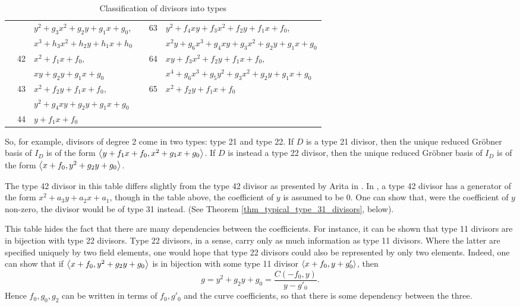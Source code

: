 \begin{table}[hb!]
\begin{center}
\begin{tabular}{l|l|l||l|l|l}
    & & $y^2 + g_3x^2 + g_2y + g_1x + g_0$, & &\multirow{2}{*}{63} & $y^2 + f_4xy + f_3x^2 + f_2y + f_1x + f_0$, \\
    & & $x^3 + h_3x^2 + h_2y + h_1x + h_0$ & & & $x^2y + g_6x^3 + g_4xy + g_3x^2 + g_2y + g_1x + g_0$ \\
    \cline{2-3}\cline{5-6}
    &\multirow{2}{*}{42} & $x^2 + f_1x + f_0$, & &\multirow{2}{*}{64} & $xy + f_3x^2 + f_2y + f_1x + f_0$, \\
    & & $xy + g_2y + g_1x + g_0$ & & & $x^4 + g_6x^3 + g_5y^2 + g_3x^2 + g_2y + g_1x + g_0$ \\
    \cline{2-3}\cline{5-6}
    &\multirow{2}{*}{43} & $x^2 + f_2y + f_1x + f_0$, & &\multirow{1}{*}{65} & $x^2 + f_2y + f_1x + f_0$ \\
    \cline{4-6}
    & & $y^2 + g_4xy + g_2y + g_1x + g_0$ \\
    \cline{2-3}
    &\multirow{1}{*}{44}
      & $y + f_1x + f_0$
\end{tabular}
\end{center}
\caption{Classification of divisors into types}
\end{table}

So, for example, divisors of degree 2 come in two types: type 21 and type 22.
If $D$ is a type 21 divisor,
then the unique reduced Gr\"obner basis of $I_D$ is of the form $\left\langle y + f_1x + f_0, x^2 + g_1x + g_0 \right\rangle$.
If $D$ is instead a type 22 divisor,
then the unique reduced Gr\"obner basis of $I_D$ is of the form $\left\langle x + f_0, y^2 + g_2y + g_0 \right\rangle$.

The type 42 divisor in this table differs slightly from the type 42 divisor as presented by Arita in \cite{arita05-2}.
In \cite{arita05-2}, a type 42 divisor has a generator of the form $x^2 + a_3y + a_2x + a_1$,
though in the table above, the coefficient of $y$ is assumed to be 0.
One can show that, were the coefficient of $y$ non-zero, the divisor would be of type 31 instead.
(See Theorem \ref{thm_typical_type_31_divisors}, below).

This table hides the fact that there are many dependencies between the coefficients.
For instance, it can be shown that type 11 divisors are in bijection with type 22 divisors.
Type 22 divisors, in a sense, carry only as much information as type 11 divisors.
Where the latter are specified uniquely by two field elements,
one would hope that type 22 divisors could also be represented by only two elements.
Indeed, one can show that if $\left\langle x + f_0, y^2 + g_2y + g_0 \right\rangle$
is in bijection with some type 11 divisor $\left\langle x + f_0, y + g'_0 \right\rangle$, then
  \[ g = y^2 + g_2y + g_0 = \frac {C(-f_0, y)}{y - g'_0}. \]
Hence $f_0, g_0, g_2$ can be written in terms of $f_0, g'_0$ and the curve coefficients,
so that there is some dependency between the three.

